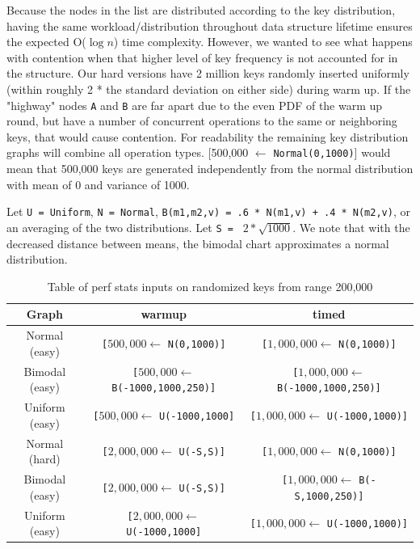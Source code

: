 \documentclass[11pt]{article}
\newcommand{\ttt}[1]{\texttt{#1}}
\begin{document}
Because the nodes in the list are distributed according to the key distribution, having the same workload/distribution throughout data structure lifetime ensures the expected O($\log n$) time complexity. However, we wanted to see what happens with contention when that higher level of key frequency is not accounted for in the structure. Our hard versions have 2 million keys randomly inserted uniformly (within roughly 2 * the standard deviation on either side) during warm up. If the "highway" nodes \ttt{A} and \ttt{B} are far apart due to the even PDF of the warm up round, but have a number of concurrent operations to the same or neighboring keys, that would cause contention.
For readability the remaining key distribution graphs will combine all operation types. 
[500,000 $\leftarrow$ \ttt{Normal(0,1000)}] would mean that 500,000 keys are generated independently from the normal distribution with mean of 0 and variance of 1000. 

Let \ttt{U = Uniform}, \ttt{N = Normal}, \ttt{B(m1,m2,v) = .6 * N(m1,v) + .4 * N(m2,v)}, or an averaging of the two distributions. Let \ttt{S = } $2 * \sqrt{1000}$. We note that with the decreased distance between means, the bimodal chart approximates a normal distribution.

\begin{table}[ht]
\begin{center}
\begin{tabular}{|c | c | c|}
 \hline
 Graph & warmup & timed \\ 
 \hline \hline
 \hline
 Normal (easy) & \ttt{[}$500,000 \leftarrow$ \ttt{N(0,1000)]} & \ttt{[}$1,000,000  \leftarrow$ \ttt{N(0,1000)]} \\
 \hline
 Bimodal (easy) & \ttt{[}$500,000 \leftarrow$ \ttt{B(-1000,1000,250)]} & \ttt{[}$1,000,000  \leftarrow$ \ttt{B(-1000,1000,250)]} \\
 Uniform (easy) & \ttt{[}$500,000 \leftarrow$ \ttt{U(-1000,1000]} & \ttt{[}$1,000,000  \leftarrow$ \ttt{U(-1000,1000)]} \\
 \hline
 Normal (hard) & \ttt{[}$2,000,000 \leftarrow$ \ttt{U(-S,S)]} & \ttt{[}$1,000,000  \leftarrow$ \ttt{N(0,1000)]} \\
 \hline
 Bimodal (easy) & \ttt{[}$2,000,000 \leftarrow$ \ttt{U(-S,S)]} & \ttt{[}$1,000,000  \leftarrow$ \ttt{B(-S,1000,250)]} \\
 Uniform (easy) & \ttt{[}$2,000,000 \leftarrow$ \ttt{U(-1000,1000]} & \ttt{[}$1,000,000  \leftarrow$ \ttt{U(-1000,1000)]} \\
 \hline
\end{tabular}
\label{table:2}
\caption{Table of perf stats inputs on randomized keys from range 200,000}
\end{center}
\end{table}
\end{document}

